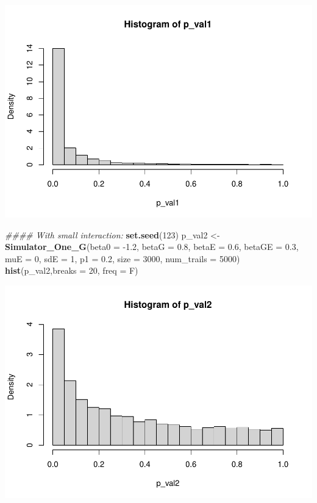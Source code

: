 \documentclass[
]{article}
\newenvironment{Shaded}{\begin{snugshade}}{\end{snugshade}}
\newcommand{\CommentTok}[1]{\textcolor[rgb]{0.56,0.35,0.01}{\textit{#1}}}
\newcommand{\DataTypeTok}[1]{\textcolor[rgb]{0.13,0.29,0.53}{#1}}
\newcommand{\DecValTok}[1]{\textcolor[rgb]{0.00,0.00,0.81}{#1}}
\newcommand{\FloatTok}[1]{\textcolor[rgb]{0.00,0.00,0.81}{#1}}
\newcommand{\KeywordTok}[1]{\textcolor[rgb]{0.13,0.29,0.53}{\textbf{#1}}}
\newcommand{\NormalTok}[1]{#1}
\newcommand{\StringTok}[1]{\textcolor[rgb]{0.31,0.60,0.02}{#1}}
\begin{document}
\includegraphics{stats-gene-research-progress-v4_files/figure-latex/unnamed-chunk-1-2.pdf}

\begin{Shaded}
\begin{Highlighting}[]
\CommentTok{#### With small interaction:}
\KeywordTok{set.seed}\NormalTok{(}\DecValTok{123}\NormalTok{)}
\NormalTok{p_val2 <-}\StringTok{ }\KeywordTok{Simulator_One_G}\NormalTok{(}\DataTypeTok{beta0 =} \FloatTok{-1.2}\NormalTok{, }\DataTypeTok{betaG =} \FloatTok{0.8}\NormalTok{, }\DataTypeTok{betaE =} \FloatTok{0.6}\NormalTok{, }\DataTypeTok{betaGE =} \FloatTok{0.3}\NormalTok{, }\DataTypeTok{muE =} \DecValTok{0}\NormalTok{, }\DataTypeTok{sdE =} \DecValTok{1}\NormalTok{, }\DataTypeTok{p1 =} \FloatTok{0.2}\NormalTok{, }\DataTypeTok{size =} \DecValTok{3000}\NormalTok{, }\DataTypeTok{num_trails =} \DecValTok{5000}\NormalTok{)}
\KeywordTok{hist}\NormalTok{(p_val2,}\DataTypeTok{breaks =} \DecValTok{20}\NormalTok{, }\DataTypeTok{freq =}\NormalTok{ F)}
\end{Highlighting}
\end{Shaded}

\includegraphics{stats-gene-research-progress-v4_files/figure-latex/unnamed-chunk-1-3.pdf}
\end{document}
